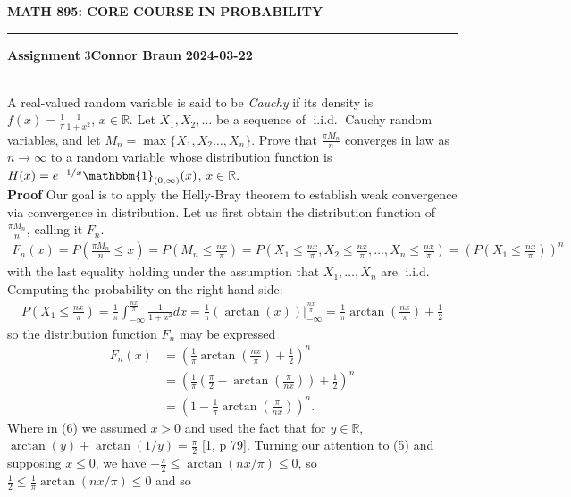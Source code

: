 \documentclass[10pt]{article}
\newcommand{\bp}[1]{\left({#1}\right)}
\newcommand{\mbb}[1]{\mathbb{#1}}
\newcommand{\1}[1]{\mathbbm{1}_{#1}}
\DeclareMathOperator{\iid}{i.i.d.}
\begin{document}
    \begin{center}
        {\bf\large{MATH 895: CORE COURSE IN PROBABILITY}}
        \smallskip
        \hrule
        \smallskip
        {\bf Assignment} 3\hfill {\bf Connor Braun} \hfill {\bf 2024-03-22}
    \end{center}
    \\[5pt]
    A real-valued random variable is said to be {\it Cauchy} if its density is $f(x)=\frac{1}{\pi}\frac{1}{1+x^2}$, $x\in\mbb{R}$. Let $X_1,X_2,\dots$ be a sequence of $\iid$ Cauchy random variables, and
    let $M_n=\max\{X_1,X_2\dots, X_n\}$. Prove that $\frac{\pi M_n}{n}$ converges in law as $n\rightarrow\infty$ to a random variable whose distribution function is $H(x)=e^{-1/x}\1{(0,\infty)}(x)$, $x\in\mbb{R}$.\\[5pt]
    {\bf Proof}\hspace{5pt} Our goal is to apply the Helly-Bray theorem to establish weak convergence via convergence in distribution. Let us first obtain the distribution function of $\frac{\pi M_n}{n}$, calling it $F_n$.
    \begin{align*}
        F_n(x)=P\bp{\frac{\pi M_n}{n}\leq x}=P\bp{M_n\leq \frac{nx}{\pi}}=P\bp{X_1\leq \frac{nx}{\pi},X_2\leq\frac{nx}{\pi},\dots,X_n\leq\frac{nx}{\pi}}=\bp{P\bp{X_1\leq\frac{nx}{\pi}}}^n
    \end{align*}
    with the last equality holding under the assumption that $X_1,\dots,X_n$ are $\iid$ Computing the probability on the right hand side:
    \begin{align*}
        P\bp{X_1\leq\frac{nx}{\pi}}=\frac{1}{\pi}\int_{-\infty}^{\frac{nx}{\pi}}\frac{1}{1+x^2}dx=\frac{1}{\pi}\bp{\arctan(x)}\bigg|_{-\infty}^{\frac{nx}{\pi}}=\frac{1}{\pi}\arctan\bp{\frac{nx}{\pi}}+\frac{1}{2}
    \end{align*}
    so the distribution function $F_n$ may be expressed
    \begin{align*}
        F_n(x)&=\bp{\frac{1}{\pi}\arctan\bp{\frac{nx}{\pi}}+\frac{1}{2}}^n\tag{5}\\
        &=\bp{\frac{1}{\pi}\bp{\frac{\pi}{2}-\arctan\bp{\frac{\pi}{nx}}}+\frac{1}{2}}^n\tag{6}\\
        &=\bp{1-\frac{1}{\pi}\arctan\bp{\frac{\pi}{nx}}}^n.
    \end{align*}
    Where in (6) we assumed $x>0$ and used the fact that for $y\in\mbb{R}$, $\arctan(y)+\arctan(1/y)=\frac{\pi}{2}$ [1, p 79]. Turning our attention to (5) and supposing $x\leq 0$, we have $-\tfrac{\pi}{2}\leq\arctan(nx/\pi)\leq 0$, so $\tfrac{1}{2}\leq\tfrac{1}{\pi}\arctan(nx/\pi)\leq 0$ and so
\end{document}
